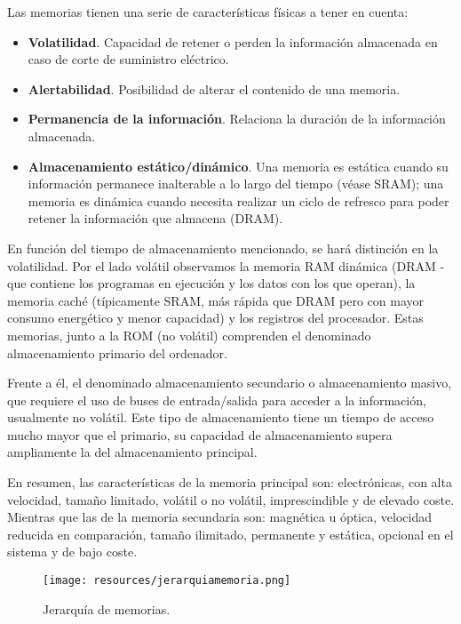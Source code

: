 \documentclass[a4paper, 11pt, titlepage]{article}
\begin{document}
        Las memorias tienen una serie de características físicas a tener en cuenta:

        \begin{itemize}
            \item \textbf{Volatilidad}. Capacidad de retener o perden la información almacenada en caso de 
            corte de suministro eléctrico.
            \item \textbf{Alertabilidad}. Posibilidad de alterar el contenido de una memoria.
            \item \textbf{Permanencia de la información}. Relaciona la duración de la información almacenada.
            \item \textbf{Almacenamiento estático/dinámico}. Una memoria es estática cuando su información 
            permanece inalterable a lo largo del tiempo (véase SRAM); una memoria es dinámica cuando necesita 
            realizar un ciclo de refresco para poder retener la información que almacena (DRAM).  
        \end{itemize}

        En función del tiempo de almacenamiento mencionado, se hará distinción en la volatilidad. Por el lado volátil 
        observamos la memoria RAM dinámica (DRAM - que contiene los programas en ejecución y los datos con los que operan), 
        la memoria caché (típicamente SRAM, más rápida que DRAM pero con mayor consumo energético y menor capacidad) y los 
        registros del procesador. Estas memorias, junto a la ROM (no volátil) comprenden el denominado almacenamiento 
        primario del ordenador.

        Frente a él, el denominado almacenamiento secundario o almacenamiento masivo, que requiere el uso de buses 
        de entrada/salida para acceder a la información, usualmente no volátil. Este tipo de almacenamiento tiene un 
        tiempo de acceso mucho mayor que el primario, su capacidad de almacenamiento supera ampliamente la del almacenamiento 
        principal.

        En resumen, las características de la memoria principal son: electrónicas, con alta velocidad, tamaño limitado, 
        volátil o no volátil, imprescindible y de elevado coste. Mientras que las de la memoria secundaria son: 
        magnética u óptica, velocidad reducida en comparación, tamaño ilimitado, permanente y estática, opcional en el sistema 
        y de bajo coste.

        \begin{figure}[htp]
            \centering
            \texttt{[image: resources/jerarquiamemoria.png]}
            \caption{Jerarquía de memorias.}
            \label{jerarquiamemoria}
        \end{figure}
\end{document}
